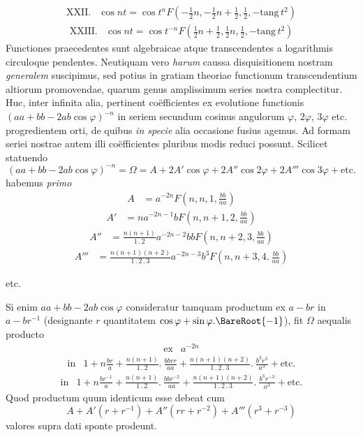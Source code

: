 \[
\begin{array}{rl}
\mathrm{XXII.}&\cos nt=\cos t^nF(-\frac{1}{2}n,-\frac{1}{2}n+\frac{1}{2},\frac{1}{2},-\mathrm{tang}\,t^2)
\end{array}
\]
\[
\begin{array}{rl}
\mathrm{XXIII.}&\cos nt=\cos t^{-n}F(\frac{1}{2}n+\frac{1}{2},\frac{1}{2}n,\frac{1}{2},-\mathrm{tang}\,t^2)
\end{array}
\]
Functiones praecedentes sunt algebraicae atque transcendentes a logarithmis circuloque pendentes. Neutiquam vero \textit{harum} caussa disquisitionem nostram
\textit{generalem} suscipimus, sed potius in gratiam theoriae functionum transcendentium altiorum promovendae, quarum genus amplissimum series nostra complectitur. Huc, inter infinita alia, pertinent co\"efficientes ex evolutione functionis
$(aa+bb-2ab\cos\varphi)^{-n}$ in seriem secundum cosinus angulorum $\varphi$, $2\varphi$, $3\varphi$ etc.
progredientem orti, de quibus \textit{in specie} alia occasione fusius agemus. Ad formam
seriei nostrae autem illi co\"efficientes pluribus modis reduci possunt. Scilicet statuendo
\[
(aa+bb-2ab\cos\varphi)^{-n}=\Omega=A+2A'\cos\varphi+2A''\cos2\varphi+2A'''\cos3\varphi+\mbox{etc.}
\]
habemus \textit{primo}
\[
\begin{array}{rl}
A&=a^{-2n}F(n,n,1,\frac{bb}{aa})
\end{array}
\]
\[
\begin{array}{rl}
A'&=na^{-2n-1}bF(n,n+1,2,\frac{bb}{aa})
\end{array}
\]
\[
\begin{array}{rl}
A''&=\frac{n(n+1)}{1\mathbin{.}2}a^{-2n-2}bbF(n,n+2,3,\frac{bb}{aa})
\end{array}
\]
\[
\begin{array}{rl}
A'''&=\frac{n(n+1)(n+2)}{1\mathbin{.}2\mathbin{.}3}a^{-2n-3}b^3F(n,n+3,4.\ \frac{bb}{aa})
\end{array}
\]
\begin{center}etc.\end{center}
Si enim $aa+bb-2ab\cos\varphi$ consideratur tamquam productum ex $a-br$ in
$a-br^{-1}$ (designante $r$ quantitatem $\cos\varphi+\sin\varphi.\BareRoot{-1}$), fit $\Omega$ aequalis producto
\[
\begin{array}{rl}
\mbox{ex}&a^{-2n}
\end{array}
\]
\[
\begin{array}{rl}
\mbox{in}&1+n\frac{br}{a}+\frac{n(n+1)}{1\mathbin{.}2}.\ \frac{bbrr}{aa}+\frac{n(n+1)(n+2)}{1\mathbin{.}2\mathbin{.}3}.\ \frac{b^3r^3}{a^3}+\mbox{etc.}
\end{array}
\]
\[
\begin{array}{rl}
\mbox{in}&1+n\frac{br^{-1}}{a}+\frac{n(n+1)}{1\mathbin{.}2}.\ \frac{bbr^{-2}}{aa}+\frac{n(n+1)(n+2)}{1\mathbin{.}2\mathbin{.}3}.\ \frac{b^3r^{-3}}{a^3}+\mbox{etc.}
\end{array}
\]
Quod productum quum identicum esse debeat cum
\[
A+A'(r+r^{-1})+A''(rr+r^{-2})+A'''(r^3+r^{-3})
\]
valores supra dati sponte prodeunt.

